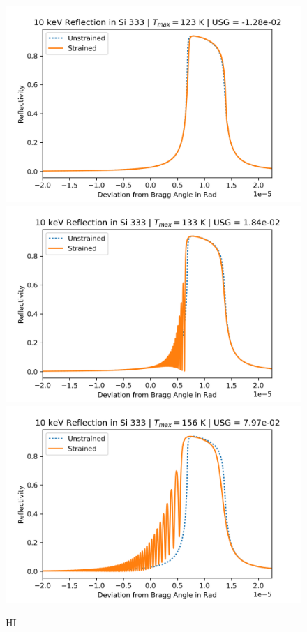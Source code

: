 \documentclass[preprint]{iucr}              %
\begin{document}
\begin{figure}
\caption{HI}
\includegraphics{images/333_10keV_4.png}
\includegraphics{images/333_10keV_5.png}
\includegraphics{images/333_10keV_7.png}

\end{figure}
\end{document}
